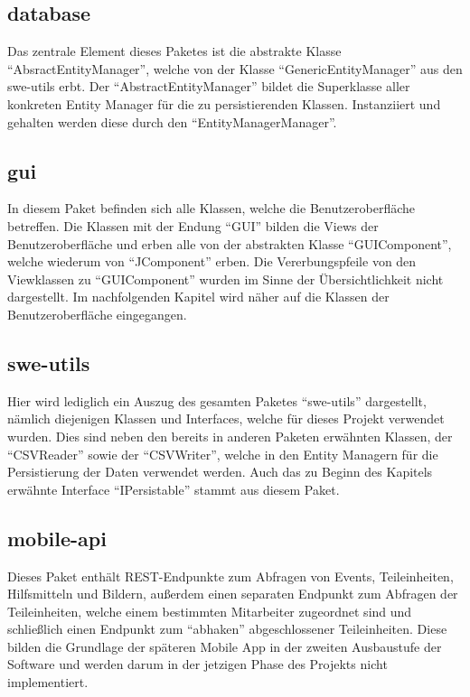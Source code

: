 \subsection{database}
Das zentrale Element dieses Paketes ist die abstrakte Klasse \enquote{AbsractEntityManager}, welche von der Klasse \enquote{GenericEntityManager} aus den swe-utils erbt. Der \enquote{AbstractEntityManager} bildet die Superklasse aller konkreten Entity Manager für die zu persistierenden Klassen. Instanziiert und gehalten werden diese durch den \enquote{EntityManagerManager}.

\subsection{gui}
In diesem Paket befinden sich alle Klassen, welche die Benutzeroberfläche betreffen. Die Klassen mit der Endung \enquote{GUI} bilden die Views der Benutzeroberfläche und erben alle von der abstrakten Klasse \enquote{GUIComponent}, welche wiederum von \enquote{JComponent} erben. Die Vererbungspfeile von den Viewklassen zu \enquote{GUIComponent} wurden im Sinne der Übersichtlichkeit nicht dargestellt. Im nachfolgenden Kapitel wird näher auf die Klassen der Benutzeroberfläche eingegangen.

\subsection{swe-utils}
Hier wird lediglich ein Auszug des gesamten Paketes \enquote{swe-utils} dargestellt, nämlich diejenigen Klassen und Interfaces, welche für dieses Projekt verwendet wurden. Dies sind neben den bereits in anderen Paketen erwähnten Klassen, der \enquote{CSVReader} sowie der \enquote{CSVWriter}, welche in den Entity Managern für die Persistierung der Daten verwendet werden. Auch das zu Beginn des Kapitels erwähnte Interface \enquote{IPersistable} stammt aus diesem Paket.

\subsection{mobile-api}
Dieses Paket enthält REST-Endpunkte zum Abfragen von Events, Teileinheiten, Hilfsmitteln und Bildern, außerdem einen separaten Endpunkt zum Abfragen der Teileinheiten, welche einem bestimmten Mitarbeiter zugeordnet sind und schließlich einen Endpunkt zum \enquote{abhaken} abgeschlossener Teileinheiten. Diese bilden die Grundlage der späteren Mobile App in der zweiten Ausbaustufe der Software und werden darum in der jetzigen Phase des Projekts nicht implementiert.

